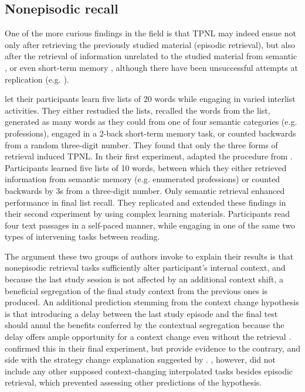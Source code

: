 \documentclass[../main.tex]{subfiles}
\begin{document}
\hypertarget{nonepisodic}{%
	\subsection{Nonepisodic recall}}

One of the more curious findings in the field is that TPNL may indeed ensue 
not only after retrieving the previously studied material (episodic 
retrieval), but also after the retrieval of information unrelated to the 
studied material from semantic \citep{divisRetrievalSpeedsContext2014, 
	pastotterRetrievalLearningFacilitates2011}, or even short-term memory 
	\citep{pastotterRetrievalLearningFacilitates2011}, although there have 
	been unsuccessful attempts at replication (e.g. 
\citealp{weinsteinNotAllRetrieval2015}). 

\cite{pastotterRetrievalLearningFacilitates2011} let their participants 
learn five lists of 20 words while engaging in varied interlist activities. 
They either restudied the lists, recalled the words from the list, generated 
as many words as they could from one of four semantic categories (e.g. 
professions), engaged in a 2-back short-term memory task, or counted 
backwards from a random three-digit number. They found that only the three 
forms of retrieval induced TPNL. In their first experiment, 
\cite{divisRetrievalSpeedsContext2014} adapted the procedure from 
\cite{pastotterRetrievalLearningFacilitates2011}. 
Participants learned five lists of 10 words, between which they either 
retrieved information from semantic memory (e.g. enumerated professions) or 
counted backwards by 3s from a three-digit number. Only semantic retrieval 
enhanced performance in final list recall. They replicated and extended 
these findings in their second experiment by using complex learning 
materials. Participants read four text passages in a self-paced manner, 
while engaging in one of the same two types of intervening tasks between 
reading. 

The argument these two groups of authors invoke to explain their results is 
that nonepisodic retrieval tasks sufficiently alter participant's internal 
context, and because the last study session is not 
affected by an additional context shift, a beneficial segregation of the 
final study context from the previous ones is produced. An additional 
prediction stemming from the context change hypothesis is that introducing a 
delay between the last study episode and the final test should annul the 
benefits conferred by the contextual segregation because the delay offers 
ample opportunity for a context change even without the retrieval 
\citep{chanRetrievalPotentiatesNew2018}. 
\cite{divisRetrievalSpeedsContext2014} confirmed this in their final 
experiment, but \cite{chanTestingPotentiatesNew2018} provide evidence to the 
contrary, and side with the strategy change explanation suggested by 
\cite{wissmanInterimTestEffect2011}. \cite{chanTestingPotentiatesNew2018}, 
however, did not include any other supposed context-changing interpolated 
tasks besides episodic retrieval, which prevented assessing other 
predictions of the hypothesis. 
\end{document}
